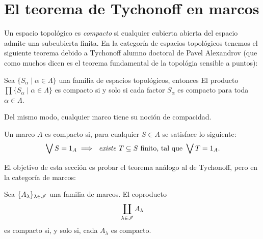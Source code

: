 \section{El teorema de Tychonoff en marcos}

Un espacio topológico es  \emph{compacto} si cualquier cubierta
abierta del espacio admite una subcubierta finita.
En la categoría de espacios topológicos tenemos el siguiente 
teorema debido a Tychonoff alumno doctoral de Pavel Alexandrov (que como muchos dicen es el teorema fundamental de la topológia sensible a puntos):

\begin{theorem}
  Sea $\{S_{\alpha}\mid\alpha\in\Lambda\}$ una familia de espacios topológicos, entonces
  El producto $\prod\{S_{\alpha}\mid\alpha\in\Lambda\}$ es compacto si y solo si cada factor $S_{\alpha}$ es compacto para toda $\alpha\in\Lambda$.
\end{theorem}

Del mismo modo, cualquier marco tiene su noción de compacidad.
\begin{definition}
Un marco $A$ es compacto si, para cualquier $S\in A$
se satisface lo siguiente:
\[
    \bigvee S= 1_A
    \implies
    \textit{ existe } T\subseteq S\text{ finito, tal que }
    \bigvee T= 1_A
.\]
\end{definition}
El objetivo de esta sección es probar el teorema análogo
al de Tychonoff, pero en la categoría de marcos:
\begin{theorem}
    Sea $\{A_\lambda\}_{\lambda\in\mathscr{I}}$ una familia de marcos.
    El coproducto
    \[
        \coprod_{\lambda\in\mathscr{I}}A_\lambda
    \]
    es compacto si, y solo si, cada $A_\lambda$ es compacto.
\end{theorem}

